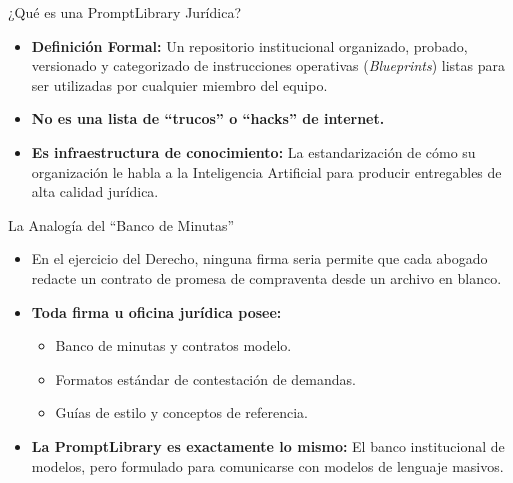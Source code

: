 \documentclass[aspectratio=169]{beamer}
\begin{document}
\begin{frame}{¿Qué es una PromptLibrary Jurídica?}

\begin{itemize}
  \item \textbf{Definición Formal:} Un repositorio institucional organizado, probado, versionado y categorizado de instrucciones operativas (\textit{Blueprints}) listas para ser utilizadas por cualquier miembro del equipo.
  \item \textbf{No es una lista de ``trucos'' o ``hacks'' de internet.}
  \item \textbf{Es infraestructura de conocimiento:} La estandarización de cómo su organización le habla a la Inteligencia Artificial para producir entregables de alta calidad jurídica.
\end{itemize}
\end{frame}

\begin{frame}{La Analogía del ``Banco de Minutas''}

\begin{itemize}
  \item En el ejercicio del Derecho, ninguna firma seria permite que cada abogado redacte un contrato de promesa de compraventa desde un archivo en blanco.
  \item \textbf{Toda firma u oficina jurídica posee:}
  \begin{itemize}
    \item Banco de minutas y contratos modelo.
    \item Formatos estándar de contestación de demandas.
    \item Guías de estilo y conceptos de referencia.
  \end{itemize}
  \item \textbf{La PromptLibrary es exactamente lo mismo:} El banco institucional de modelos, pero formulado para comunicarse con modelos de lenguaje masivos.
\end{itemize}
\end{frame}
\end{document}

